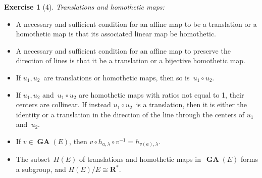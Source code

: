 \documentclass[letterpaper,12pt]{article}
\newcommand{\R}{\mathbf{R}}
\newcommand{\Rnz}{\R^*}
\newcommand{\iso}{\cong}
\newcommand{\after}{\circ}
\DeclareMathOperator{\GA}{\mathbf{GA}}
\newcommand{\inv}[1]{#1^{-1}}
\theoremstyle{definition}
\newtheorem*{exer}{Exercise}
\theoremstyle{remark}
\begin{document}
\goodbreak
\begin{exer}[4]
\emph{Translations and homothetic maps:}
\begin{itemize}[itemsep=0pt]
\item A necessary and sufficient condition for an affine map to be a translation or a homothetic map is that its associated linear map be homothetic.
\item A necessary and sufficient condition for an affine map to preserve the direction of lines is that it be a translation or a bijective homothetic map.
\item If \(u_1,u_2\)~are translations or homothetic maps, then so is~\(u_1\after u_2\).
\item If \(u_1,u_2\) and~\(u_1\after u_2\) are homothetic maps with ratios not equal to 1, their centers are collinear. If instead \(u_1\after u_2\)~is a translation, then it is either the identity or a translation in the direction of the line through the centers of \(u_1\) and~\(u_2\).
\item If \(v\in\GA(E)\), then \(v\after h_{a,\lambda}\after\inv{v}=h_{v(a),\lambda}\).
\item The subset~\(H(E)\) of translations and homothetic maps in~\(\GA(E)\) forms a subgroup, and \(H(E)/E\iso\Rnz\).
\end{itemize}
\end{exer}
\end{document}
